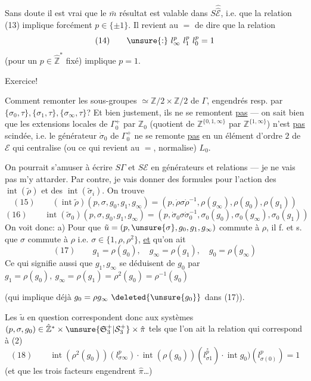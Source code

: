 Sans doute il est vrai que le $\bar m$ résultat est valable dans $S\widehat{\widehat{\mathcal E}}$, i.e. que la relation (13) implique forcément $p\in\{\pm1\}$. Il revient au $=$ de dire  que la relation
\[
(14)\qquad \unsure{:}\ l_\infty^p\ l_1^p\ l_0^p=1
\]
(pour un $p\in\hat{\mathbb Z}^*$ fixé) implique $p=1$.

Exercice!

Comment remonter les sous-groupes  $\simeq\mathbb Z/2\times\mathbb Z/2$ de $\Gamma$, engendrés resp. par $\{\sigma_0,\tau\},\{\sigma_1,\tau\},\{\sigma_\infty,\tau\}$? Et bien justement, ils ne se remontent \uline{pas} --- on sait bien que les extensions locales de $\Gamma_0^+$  par $\mathbb Z_0$ (quotient de $\mathbb Z^{\{0,1,\infty\}}$ par $\mathbb Z^{\{1,\infty\}}$) n'est \uline{pas} scindée, i.e. le générateur $\dot\sigma_0$ de $\Gamma_0^+$ ne se remonte \uline{pas} en un élément d'ordre $2$ de $\mathcal E$ qui centralise (ou ce qui revient au $=$, normalise) $L_0$.

On pourrait s'amuser à écrire $S\Gamma$ et $S\mathcal E$ en générateurs et relations --- je ne vais pas m'y attarder. Par contre, je vais donner des formules pour l'action des $\operatorname{int}(\tilde\rho)$ et des $\operatorname{int}(\tilde\sigma_i)$. On trouve
\[
(15)\qquad(\operatorname{int}\tilde\rho)(p,\sigma,g_0,g_1,g_\infty)=(p,\dot\rho\sigma\dot\rho^{-1},\rho(g_\infty),\rho(g_0),\rho(g_1))
\]
\[
(16)\qquad\operatorname{int}(\tilde\sigma_0)(p,\sigma,g_0,g_1,g_\infty)=(p,\dot\sigma_0\sigma\dot\sigma_0^{-1},\sigma_0(g_0),\sigma_0(g_\infty),\sigma_0(g_1))
\]
On voit donc: a) Pour que $\tilde u=(p,\unsure{\sigma},g_0,g_1,g_\infty)$ commute à $\rho$, il f. et s. que  $\sigma$ commute à $\rho$ i.e. $\sigma\in\{1,\rho,\rho^2\}$, \uline{et} qu'on ait
\[
(17)\qquad g_1=\rho(g_0),\quad g_\infty=\rho(g_1),\quad g_0=\rho(g_\infty)
\]
Ce qui signifie aussi que $g_1,g_\infty$ se déduisent de $g_0$ par $g_1=\rho(g_0),\ g_\infty=\rho(g_1)=\rho^2(g_0)=\rho^{-1}(g_0)$

(qui implique déjà $g_0=\rho g_\infty\ \deleted{\unsure{g_0}}$ dans (17)).

Les $\tilde u$ en question correspondent donc aux systèmes $(p,\sigma,g_0)\in\hat{\mathbb Z}^*\times\unsure{\mathfrak S_3^+|\mathcal S_3^+}\times\hat\pi$ tels que l'on ait la relation qui correspond à (2)
\[
(18)\qquad\operatorname{int}(\rho^2(g_0))(l_{\sigma\infty}^p)\cdot\operatorname{int}(\rho(g_0))(l_{\sigma1}^{\overset{*}{p}})\cdot\operatorname{int}g_0)(l_{\sigma(0)}^p)=1
\]
(et que les trois facteurs engendrent $\hat\pi$\ldots)

